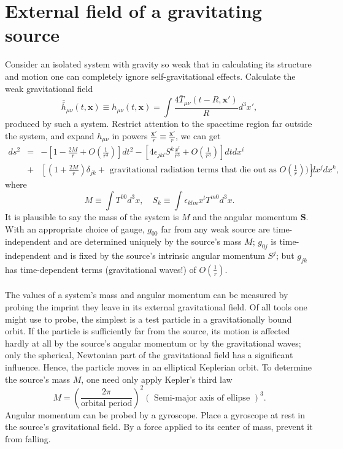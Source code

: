 \documentclass[cyan]{elegantnote}
\begin{document}
\section{External field of a gravitating source}
Consider an isolated system with gravity so weak that in calculating its structure and motion one can completely ignore self-gravitational effects. Calculate the weak gravitational field
\[\bar{\bar{h}}_{\mu\nu}(t,\bm{x}) \equiv h_{\mu\nu}(t,\bm{x}) = \int \frac{4\bar{T}_{\mu\nu}(t-R,\bm{x}')}{R} d^3x',\]
produced by such a system. Restrict attention to the spacetime region far outside the system, and expand $h_{\mu\nu}$ in powers $\frac{\bm{x}'}{r} \equiv \frac{\bm{x}'}{r}$, we can get
\begin{eqnarray}
ds^2 &=& -\left[1-\frac{2M}{r} + O(\frac{1}{r^3}) \right]dt^2 - \left[4\epsilon_{jkl}S^k \frac{x^l}{r^3} + O(\frac{1}{r^3})  \right] dtdx^i  \nonumber \\
&+& \left[(1+\frac{2M}{r})\delta_{jk} + \mbox{ gravitational radiation terms that die out as } O(\frac{1}{r}) ) \right]dx^j dx^k , \nonumber
\end{eqnarray}
where
\[M \equiv \int T^{00}d^3x , \quad S_k \equiv \int \epsilon_{klm}x^l T^{m0} d^3x .\]
It is plausible to say the mass of the system is $M$ and the angular momentum $\bm{S}$. With an appropriate choice of gauge, $g_{00}$ far from any weak source are time-independent and are determined uniquely by the source's mass $M$; $g_{0j}$ is time-independent and is fixed by the source's intrinsic angular momentum $S^j$; but $g_{jk}$ has time-dependent terms (gravitational waves!) of $O(\frac{1}{r})$.
\\ \\
The values of a system's mass and angular momentum can be measured by probing the imprint they leave in its external gravitational field. 
Of all tools one might use to probe, the simplest is a test particle in a gravitationally bound orbit. 
If the particle is sufficiently far from the source, its motion is affected hardly at all by the source's angular momentum or by the gravitational waves; only the spherical, Newtonian part of the gravitational field has a significant influence. 
Hence, the particle moves in an elliptical Keplerian orbit. To determine the source's mass $M$, one need only apply Kepler's third law
\[M = \left( \frac{2\pi}{\mbox{orbital period}} \right)^2 \left(\mbox{ Semi-major axis of ellipse } \right)^3.\]
Angular momentum can be probed by a gyroscope.
Place a gyroscope at rest in the source's gravitational field.
By a force applied to its center of mass, prevent it from falling. 
\end{document}
